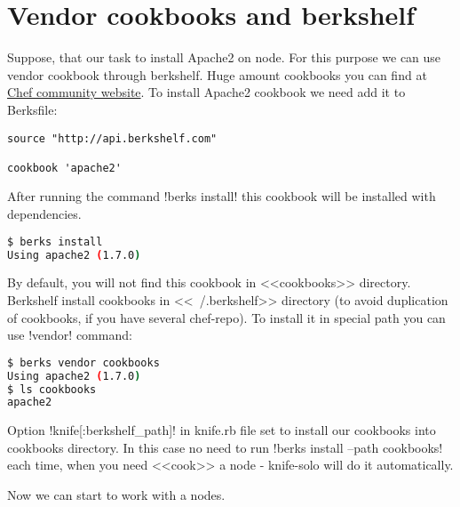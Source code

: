 \section{Vendor cookbooks and berkshelf}
\label{sec:solo-berkshelf}

Suppose, that our task to install Apache2 on node. For this purpose we can use vendor cookbook through berkshelf. Huge amount cookbooks you can find at \href{http://community.opscode.com/cookbooks}{Chef community website}. To install Apache2 cookbook we need add it to Berksfile:

\begin{lstlisting}[label=lst:my-cloud-berkshelf1,title=my-cloud/Berksfile]
source "http://api.berkshelf.com"

cookbook 'apache2'
\end{lstlisting}

After running the command \inline!berks install! this cookbook will be installed with dependencies.

\begin{lstlisting}[language=Bash,label=lst:my-cloud-berkshelf2]
$ berks install
Using apache2 (1.7.0)
\end{lstlisting}

By default, you will not find this cookbook in <<cookbooks>> directory. Berkshelf install cookbooks in <<~/.berkshelf>> directory (to avoid duplication of cookbooks, if you have several chef-repo). To install it in special path you can use \inline!vendor! command:

\begin{lstlisting}[language=Bash,label=lst:my-cloud-berkshelf3]
$ berks vendor cookbooks
Using apache2 (1.7.0)
$ ls cookbooks
apache2
\end{lstlisting}

Option \inline!knife[:berkshelf_path]! in knife.rb file set to install our cookbooks into cookbooks directory. In this case no need to run \inline!berks install --path cookbooks! each time, when you need <<cook>> a node - knife-solo will do it automatically.

Now we can start to work with a nodes.
